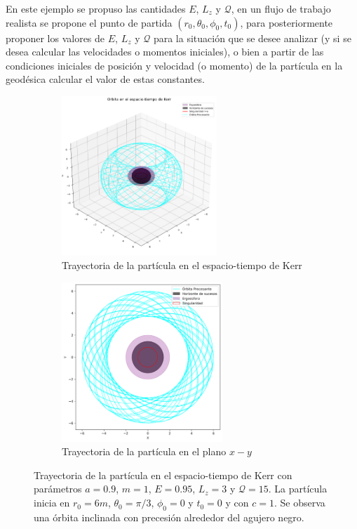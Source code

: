 En este ejemplo se propuso las cantidades $E$, $L_z$ y $\mathcal{Q}$, en un flujo de trabajo realista se propone el punto de partida  $(r_0, \theta_0, \phi_0, t_0)$, para posteriormente proponer los valores de $E$, $L_z$ y $\mathcal{Q}$ para la situación que se desee analizar (y si se desea calcular las velocidades o momentos iniciales), o bien a partir de las condiciones iniciales de posición y velocidad (o momento) de la partícula en la geodésica calcular el valor de estas constantes.

\begin{figure}[H]
    \begin{subfigure}{0.5\textwidth}
        \includegraphics[width=0.9\linewidth, height=6cm]{AgujerosNegros/kerr/geodesics_plots/Geodesica1.png}
        \caption{Trayectoria de la partícula en el espacio-tiempo de Kerr}
    \end{subfigure}
    \begin{subfigure}{0.5\textwidth}
        \includegraphics[width=0.9\linewidth, height=6cm]{AgujerosNegros/kerr/geodesics_plots/Geodesica1_planoxy.png}
        \caption{Trayectoria de la partícula en el plano $x-y$}
    \end{subfigure}
    \caption{Trayectoria de la partícula en el espacio-tiempo de Kerr con parámetros $a=0.9$, $m=1$, $E=0.95$, $L_z=3$ y $\mathcal{Q}=15$. La partícula inicia en $r_0=6m$, $\theta_0=\pi/3$, $\phi_0=0$ y $t_0=0$ y con $c = 1$. Se observa una órbita inclinada con precesión alrededor del agujero negro.}
\end{figure}

